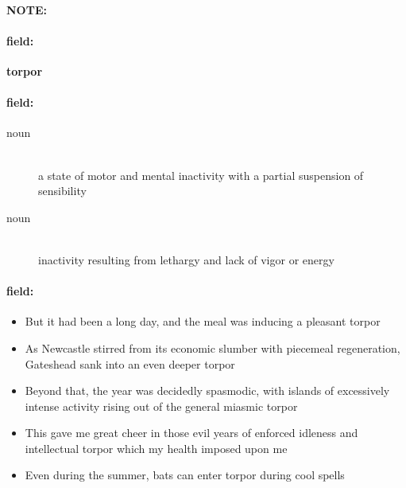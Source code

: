\documentclass[12pt]{article}
\newenvironment{note}{\paragraph{NOTE:}}{}
\newenvironment{field}{\paragraph{field:}}{}
\begin{document}
\begin{note}
\begin{field}
\textbf{\large torpor}
\end{field}


\begin{field}
\begin{description}
\item[noun] \hfill \\ 
a state of motor and mental inactivity with a partial suspension of sensibility

\item[noun] \hfill \\ 
inactivity resulting from lethargy and lack of vigor or energy

\end{description}
\end{field}

\begin{field}
\begin{itemize}
\item But it had been a long day, and the meal was inducing a pleasant torpor
\item As Newcastle stirred from its economic slumber with piecemeal regeneration, Gateshead sank into an even deeper torpor
\item Beyond that, the year was decidedly spasmodic, with islands of excessively intense activity rising out of the general miasmic torpor
\item This gave me great cheer in those evil years of enforced idleness and intellectual torpor which my health imposed upon me
\item Even during the summer, bats can enter torpor during cool spells
\end{itemize}
\end{field}
\end{note}
\end{document}
